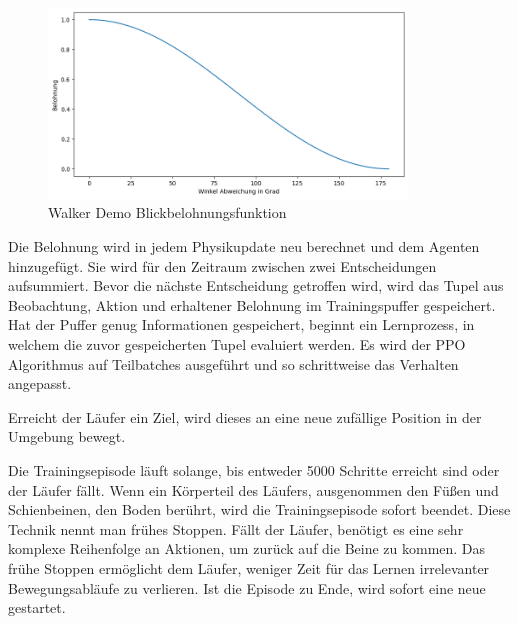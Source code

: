 \begin{figure}[H]
  \centering  
  \includegraphics[width=0.85\textwidth]{img/plot_demo_look}
  \caption{Walker Demo Blickbelohnungsfunktion}
  \label{fig:plot_demo_look}
\end{figure}

Die Belohnung wird in jedem Physikupdate neu berechnet und dem Agenten hinzugefügt. Sie wird für den Zeitraum zwischen zwei Entscheidungen aufsummiert. Bevor die nächste Entscheidung getroffen wird, wird das Tupel aus Beobachtung, Aktion und erhaltener Belohnung im Trainingspuffer gespeichert. Hat der Puffer genug Informationen gespeichert, beginnt ein Lernprozess, in welchem die zuvor gespeicherten Tupel evaluiert werden. Es wird der PPO Algorithmus auf Teilbatches ausgeführt und so schrittweise das Verhalten angepasst.

Erreicht der Läufer ein Ziel, wird dieses an eine neue zufällige Position in der Umgebung bewegt.

Die Trainingsepisode läuft solange, bis entweder 5000 Schritte erreicht sind oder der Läufer fällt. Wenn ein Körperteil des Läufers, ausgenommen den Füßen und Schienbeinen, den Boden berührt, wird die Trainingsepisode sofort beendet. Diese Technik nennt man \grqq{}frühes Stoppen\grqq{}. Fällt der Läufer, benötigt es eine sehr komplexe Reihenfolge an Aktionen, um zurück auf die Beine zu kommen. Das frühe Stoppen ermöglicht dem Läufer, weniger Zeit für das Lernen irrelevanter Bewegungsabläufe zu verlieren. Ist die Episode zu Ende, wird sofort eine neue gestartet.

